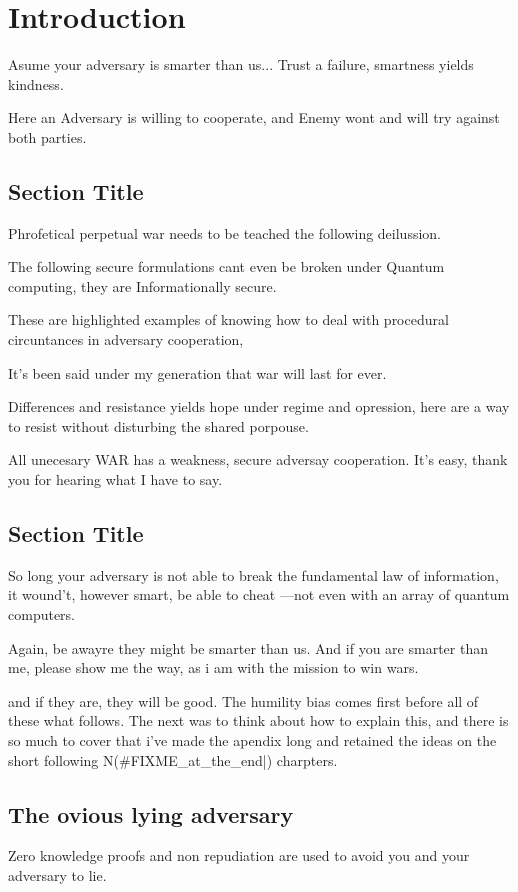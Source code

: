 \chapter{Introduction}
Asume your adversary is smarter than us... Trust a failure, smartness yields kindness. 


Here an Adversary is willing to cooperate, and Enemy wont and will try against both parties. 

\section{Section Title}
Phrofetical perpetual war needs to be teached the following deilussion. 

The following secure formulations cant even be broken under Quantum computing, they are Informationally secure. 

These are highlighted examples of knowing how to deal with procedural circuntances in adversary cooperation, 

It's been said under my generation that war will last for ever. 

Differences and resistance yields hope under regime and opression, 
here are a way to resist without disturbing the shared porpouse. 

All unecesary WAR has a weakness, secure adversay cooperation. It's easy, thank you for hearing what I have to say. 


\section{Section Title}
So long your adversary is not able to break the fundamental law of information, 
it wound't, however smart, be able to cheat ---not even with an array of quantum computers. 

Again, be awayre they might be smarter than us. And if you are smarter than me, 
please show me the way, as i am with the mission to win wars. 

and if they are, they will be good. The humility bias comes first before all of these what follows. 
The next was to think about how to explain this, and there is so much to cover that i've made the 
apendix long and retained the ideas on the short following N(#FIXME_at_the_end|) charpters. 

\section{The ovious lying adversary}
Zero knowledge proofs and non repudiation are used to avoid you and your adversary to lie. 


